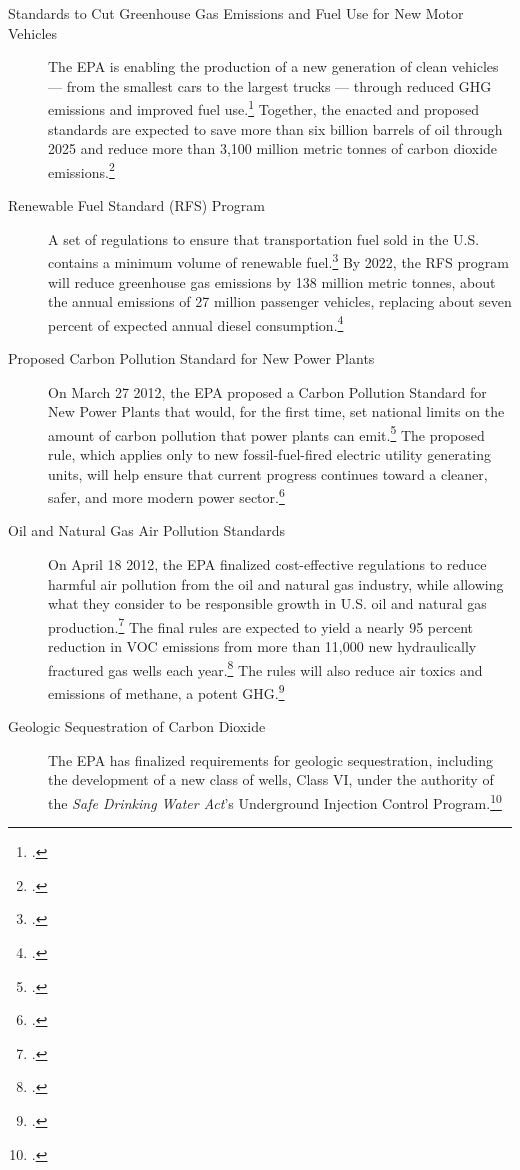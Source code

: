 \documentclass[10pt]{article}
\begin{document}
\begin{description}
	\item [Standards to Cut Greenhouse Gas Emissions and Fuel Use for New Motor Vehicles] The EPA is enabling the production of a new generation of clean vehicles --- from the smallest cars to the largest trucks --- through reduced GHG emissions and improved fuel use.\footcite[][]{EPAinitiatives} Together, the enacted and proposed standards are expected to save more than six billion barrels of oil through 2025 and reduce more than 3,100 million metric tonnes of carbon dioxide emissions.\footcite[][]{EPAinitiatives}
	\item [Renewable Fuel Standard (RFS) Program] A set of regulations to ensure that transportation fuel sold in the U.S. contains a minimum volume of renewable fuel.\footcite[][]{EPAinitiatives} By 2022, the RFS program will reduce greenhouse gas emissions by 138 million metric tonnes, about the annual emissions of 27 million passenger vehicles, replacing about seven percent of expected annual diesel consumption.\footcite[][]{EPAinitiatives}
	\item [Proposed Carbon Pollution Standard for New Power Plants] On March 27 2012, the EPA proposed a Carbon Pollution Standard for New Power Plants that would, for the first time, set national limits on the amount of carbon pollution that power plants can emit.\footcite[][]{EPAinitiatives} The proposed rule, which applies only to new fossil-fuel-fired electric utility generating units, will help ensure that current progress continues toward a cleaner, safer, and more modern power sector.\footcite[][]{EPAinitiatives}
	\item [Oil and Natural Gas Air Pollution Standards] On April 18 2012, the EPA finalized cost-effective regulations to reduce harmful air pollution from the oil and natural gas industry, while allowing what they consider to be responsible growth in U.S. oil and natural gas production.\footcite[][]{EPAinitiatives} The final rules are expected to yield a nearly 95 percent reduction in VOC emissions from more than 11,000 new hydraulically fractured gas wells each year.\footcite[][]{EPAinitiatives} The rules will also reduce air toxics and emissions of methane, a potent GHG.\footcite[][]{EPAinitiatives}
	\item [Geologic Sequestration of Carbon Dioxide] The EPA has finalized requirements for geologic sequestration, including the development of a new class of wells, Class VI, under the authority of the \emph{Safe Drinking Water Act}'s Underground Injection Control Program.\footcite[][]{EPAinitiatives}
\end{description}
\end{document}
